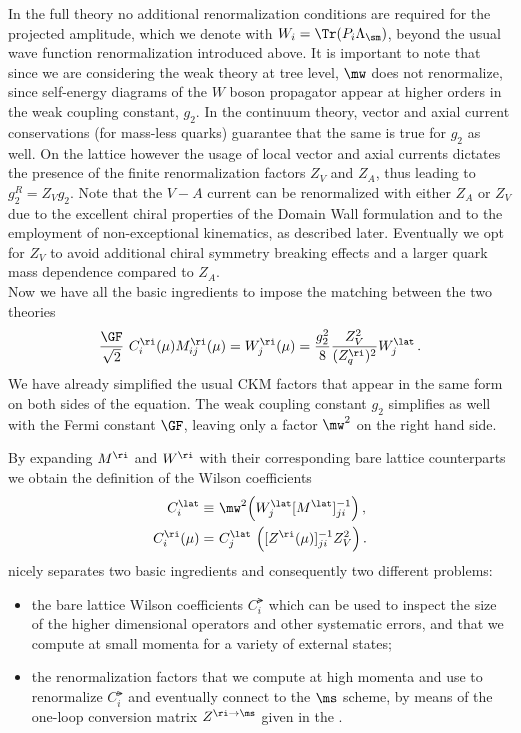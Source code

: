\documentclass[aps,prd,twocolumn,nofootinbib,showpacs,superscriptaddress]{revtex4-1}
\begin{document}
In the full theory no additional renormalization conditions are required
for the projected amplitude, which we denote with $W_i = \Tr ( P_i \Lambda_\sm )$, 
beyond the usual wave function renormalization introduced above.
It is important to note that since we are considering the weak theory at tree level, 
$\mw$ does not renormalize, since self-energy diagrams of the
$W$ boson propagator appear at higher orders in
the weak coupling constant, $g_2$.
In the continuum theory, vector and axial 
current conservations (for mass-less quarks) guarantee that
the same is true for $g_2$ as well.
On the lattice however the usage of 
local vector and axial currents 
dictates the presence of the finite
renormalization factors $Z_V$ and $Z_A$, 
thus leading to $g_2^R = Z_V g_2$.
Note that the $V-A$ current can be renormalized with either $Z_A$ or $Z_V$
due to the excellent chiral properties of the Domain Wall formulation
and to the employment of non-exceptional kinematics, as described later.
Eventually we opt for $Z_V$ to avoid additional 
chiral symmetry breaking effects and a larger quark mass
dependence compared to $Z_A$.\\

Now we have all the basic ingredients to impose the matching between the two theories 
\begin{equation}
\frac{\GF}{\sqrt{2}} \ C_i^{\ri}(\mu) M_{ij}^{\ri}(\mu) = W_j^{\ri}(\mu) =
\frac{g_2^2}{8} \frac{Z_V^2}{(Z_q^\ri)^2} W_j^\lat \,.
\label{eq:matching}
\end{equation}
We have already simplified the usual CKM factors
that appear in the same form on both sides of the equation. 
The weak coupling constant $g_2$ 
simplifies as well with the Fermi constant $\GF$, leaving only a factor $\mw^2$ on the right hand side.

By expanding $M^\ri$ and $W^\ri$ with their corresponding bare lattice counterparts we 
obtain the definition of the Wilson coefficients
\begin{equation}
\begin{split}
C_i^\lat \equiv & \ \mw^2 \Big( W_j^{\lat} [M^{\lat}]^{-1}_{ji} \Big) \,, \\
C_i^{\ri}(\mu) = & \ C_j^\lat  \
 \Big( [Z^{\ri}(\mu)]^{-1}_{ji} Z_V^2 \Big) \,.
 \end{split}
\label{eq:wcoeff}
\end{equation}
 nicely separates two basic ingredients and consequently 
two different problems: 

\begin{itemize}

\item the bare lattice Wilson coefficients $C_i^\lat$
which can be used to inspect the size of the higher dimensional operators and other systematic errors, 
and that we compute at small momenta for a variety of external states;

\item the renormalization factors that we compute 
at high momenta and use to renormalize $C_i^\lat$ and eventually connect to the 
$\ms$ scheme, by means of the one-loop conversion matrix $Z^{\ri \to \ms}$ given in 
the \app{app:rims}.

\end{itemize}
\end{document}
